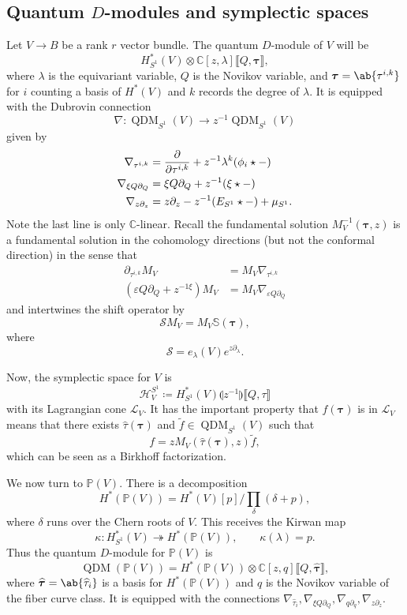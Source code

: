 \documentclass[leqno, openany]{memoir}
\theoremstyle{definition}
\theoremstyle{remark}
\theoremstyle{plain}
\theoremstyle{definition}
\theoremstyle{remark}
\newcommand{\C}{\mathbb{C}}
\renewcommand{\P}{\mathbb{P}}
\newcommand{\ep}{\varepsilon}
\newcommand{\mc}[1]{\mathcal{#1}}
\newcommand{\wt}[1]{\widetilde{#1}}
\newcommand{\wh}[1]{\widehat{#1}}
\DeclareMathOperator{\QDM}{QDM}
\begin{document}
\subsection{Quantum $D$-modules and symplectic spaces}%
\label{sub:Quantum D modules and symplectic spaces}


Let $V \to B$ be a rank $r$ vector bundle. The quantum $D$-module of $V$ will be
\[ H^*_{S^1}(V) \otimes \C[z,\lambda] \llbracket Q,\bm{\tau} \rrbracket, \]
where $\lambda$ is the equivariant variable, $Q$ is the Novikov variable, and $\bm{\tau} = \ab\{ \tau^{i,k}\}$ for $i$ counting a basis of $H^*(V)$ and $k$ records the degree of $\lambda$. It is equipped with the Dubrovin connection
\[ \nabla \colon \QDM_{S^1}(V) \to z^{-1} \QDM_{S^1}(V) \]
given by
\begin{align*}
    \nabla_{\tau^{i,k}} &= \pdv{}{\tau^{i,k}} + z^{-1} \lambda^k (\phi_i \star - ) \\
    \nabla_{\xi Q \partial_Q} &= \xi Q \partial_Q + z^{-1} (\xi \star -) \\
    \nabla_{z \partial_z} &= z \partial_z - z^{-1} (E_{S^1} \star -) + \mu_{S^1}.
\end{align*}
Note the last line is only $\C$-linear. Recall the fundamental solution $M^{-1}_V(\bm{\tau}, z)$ is a fundamental solution in the cohomology directions (but not the conformal direction) in the sense that
\begin{align*}
    \partial_{\tau^{i,k}} M_V &= M_V \nabla_{\tau^{i,k}} \\
    (\ep Q \partial_Q + z^{-1 \xi}) M_V &= M_V \nabla_{\ep Q \partial_Q} 
\end{align*}
and intertwines the shift operator by
\[ \mc{S} M_V = M_V \mathbb{S}(\bm{\tau}), \]
where
\[ \mc{S} = e_{\lambda}(V) e^{z \partial_{\lambda}}. \]

Now, the symplectic space for $V$ is
\[ \mc{H}_V^{S^1} \coloneqq H^*_{S^1}(V) \llparenthesis z^{-1} \rrparenthesis \llbracket Q,\tau \rrbracket \]
with its Lagrangian cone $\mc{L}_V$. It has the important property that $f(\bm{\tau})$ is in $\mc{L}_V$ means that there exists $\wh{\tau}(\bm{\tau})$ and $\wt{f} \in \QDM_{S^1}(V)$ such that 
\[ f = z M_V(\wh{\tau}(\bm{\tau}), z) \wt{f}, \]
which can be seen as a Birkhoff factorization.

We now turn to $\P(V)$. There is a decomposition
\[ H^*(\P(V)) = H^*(V)[p] / \prod_{\delta} (\delta + p), \]
where $\delta$ runs over the Chern roots of $V$. This receives the Kirwan map
\[ \kappa \colon H_{S^1}^*(V) \twoheadrightarrow H^*(\P(V)), \qquad \kappa (\lambda) = p. \]
Thus the quantum $D$-module for $\P(V)$ is
\[ \QDM(\P(V)) = H^*(\P(V)) \otimes \C[z,q] \llbracket Q, \wh{\bm{\tau}} \rrbracket, \]
where $\wh{\bm{\tau}} = \ab\{ \wh{\tau}_i\}$ is a basis for $H^*(\P(V))$ and $q$ is the Novikov variable of the fiber curve class. It is equipped with the connections $\nabla_{\wh{\tau}_i}, \nabla_{\xi Q \partial_Q}, \nabla_{q \partial_q}, \nabla_{z \partial_z}$.
\end{document}
